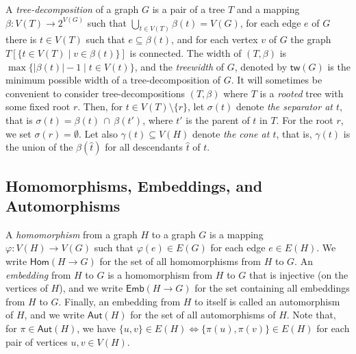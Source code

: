 \documentclass[authorcolumns,numberwithinsect]{no-lipics-v2022}
\newcommand{\homs}[2]{\mathsf{Hom}(#1 \to #2)}
\newcommand{\embs}[2]{\mathsf{Emb}(#1 \to #2)}
\newcommand{\auts}{\mathsf{Aut}}
\begin{document}
A \emph{tree-decomposition} of a graph $G$ is a pair of a tree $T$ and a mapping $\beta: V(T) \to 2^{V(G)}$ such that $\bigcup_{t\in V(T)} \beta(t)=V(G)$, for each edge $e$ of $G$ there is $t\in V(T)$ such that $e \subseteq \beta(t)$, and for each vertex $v$ of $G$ the graph $T[\{t\in V(T)\mid v\in \beta(t)\}]$ is connected.
The width of $(T,\beta)$ is $\max\{|\beta(t)|-1 \mid t\in V(t)\}$, and the \emph{treewidth} of $G$, denoted by $\mathsf{tw}(G)$ is the minimum possible width of a tree-decomposition of $G$. 
It will sometimes be convenient to consider tree-decompositions $(T,\beta)$ where $T$ is a \emph{rooted} tree with some fixed root $r$. Then,
for $t \in V(T)\setminus\{r\}$, let $\sigma(t)$ denote \textit{the separator at $t$}, that is $\sigma(t) = \beta(t)\,\cap\,\beta(t')$, where $t'$ is the parent of $t$ in $T$. For the root $r$, we set $\sigma(r) = \emptyset$. Let also $\gamma(t)\subseteq V(H)$ denote \textit{the cone at $t$}, that is, $\gamma(t)$ is the union of the $\beta(\hat{t})$ for all descendants $\hat{t}$ of $t$.



\subsection{Homomorphisms, Embeddings, and Automorphisms}
A \emph{homomorphism} from a graph $H$ to a graph $G$ is a mapping $\varphi: V(H) \to V(G)$ such that $\varphi(e)\in E(G)$ for each edge $e\in E(H)$. We write $\homs{H}{G}$ for the set of all homomorphisms from $H$ to $G$. An \emph{embedding} from $H$ to $G$ is a homomorphism from $H$ to $G$ that is injective (on the vertices of $H$), and we write $\embs{H}{G}$ for the set containing all embeddings from $H$ to $G$. Finally, an embedding from $H$ to itself is called an automorphism of $H$, and we write $\auts(H)$ for the set of all automorphisms of $H$. Note that, for $\pi \in \auts(H)$, we have $\{u,v\}\in E(H)\Leftrightarrow \{\pi(u),\pi(v)\}\in E(H)$ for each pair of vertices $u,v \in V(H)$.
\end{document}
